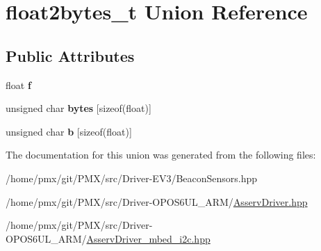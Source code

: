 \hypertarget{unionfloat2bytes__t}{}\section{float2bytes\+\_\+t Union Reference}
\label{unionfloat2bytes__t}
\subsection*{Public Attributes}
\begin{DoxyCompactItemize}
\item 
\mbox{\label{unionfloat2bytes__t_ad29013536cecdb94e42793b04a31f461}} 
float {\bfseries f}
\item 
\mbox{\label{unionfloat2bytes__t_af54996edf8a4b443c00dadec4ec95755}} 
unsigned char {\bfseries bytes} \mbox{[}sizeof(float)\mbox{]}
\item 
\mbox{\label{unionfloat2bytes__t_aad915968d32eb21d8f531662fa928881}} 
unsigned char {\bfseries b} \mbox{[}sizeof(float)\mbox{]}
\end{DoxyCompactItemize}


The documentation for this union was generated from the following files\+:\begin{DoxyCompactItemize}
\item 
/home/pmx/git/\+P\+M\+X/src/\+Driver-\/\+E\+V3/Beacon\+Sensors.\+hpp\item 
/home/pmx/git/\+P\+M\+X/src/\+Driver-\/\+O\+P\+O\+S6\+U\+L\+\_\+\+A\+R\+M/\hyperlink{Driver-OPOS6UL__ARM_2AsservDriver_8hpp}{Asserv\+Driver.\+hpp}\item 
/home/pmx/git/\+P\+M\+X/src/\+Driver-\/\+O\+P\+O\+S6\+U\+L\+\_\+\+A\+R\+M/\hyperlink{AsservDriver__mbed__i2c_8hpp}{Asserv\+Driver\+\_\+mbed\+\_\+i2c.\+hpp}\end{DoxyCompactItemize}
